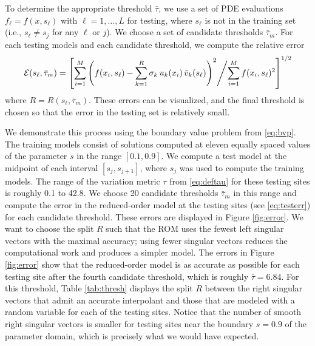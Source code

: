\documentclass[final]{siamltex}
\begin{document}
To determine the appropriate threshold $\bar{\tau}$, we use a set of
PDE evaluations $f_\ell =f(x,s_\ell)$ with $\ell=1,\dots,L$ for
testing, where $s_\ell$ is not in the training set (i.e.,
$s_\ell\not=s_j$ for any $\ell$ or $j$). We choose a set of candidate
thresholds $\bar{\tau}_m$.  For each testing models and each candidate
threshold, we compute the relative error
\begin{equation}
\label{eq:testerr}
{\mathcal{E}}(s_\ell,\bar{\tau}_m) = \left[
\sum_{i=1}^M \left(
f(x_i,s_\ell) - \sum_{k=1}^R \sigma_k\,u_k(x_i)\,\tilde{v}_k(s_\ell)
\right)^2 \middle/ 
\sum_{i=1}^M
f(x_i,s_\ell)^2 
\right]^{1/2}
\end{equation}
where $R=R(s_\ell,\bar{\tau}_m)$. These errors can be visualized, and
the final threshold is chosen so that the error in the testing set is
relatively small.

We demonstrate this process using the boundary value problem from
\eqref{eq:bvp}. The training models consist of solutions computed at
eleven equally spaced values of the parameter $s$ in the range
$[0.1,0.9]$.  We compute a test model at the midpoint of each interval
$[s_j,s_{j+1}]$, where $s_j$ was used to compute the training
models. The range of the variation metric $\tau$ from
\eqref{eq:deftau} for these testing sites is roughly 0.1 to 42.8. We
choose 20 candidate thresholds $\bar{\tau}_m$ in this range and
compute the error in the reduced-order model at the testing sites (see
\eqref{eq:testerr}) for each candidate threshold. These errors are
displayed in Figure \ref{fig:error}. We want to choose the split $R$
such that the ROM uses the fewest left singular vectors with
the maximal accuracy; using fewer singular vectors reduces the 
computational work and produces a simpler model. 
The errors in Figure \ref{fig:error} show that
the reduced-order model is as accurate as possible for each testing
site after the fourth candidate threshold, which is roughly
$\bar{\tau}=6.84$.
For this threshold, Table \ref{tab:thresh} displays
the split $R$ between the right singular vectors that admit an
accurate interpolant and those that are modeled with a random variable
for each of the testing sites. Notice that the number of smooth right
singular vectors is smaller for testing sites near the boundary
$s=0.9$ of the parameter domain, which is precisely what we would have
expected.
\end{document}
